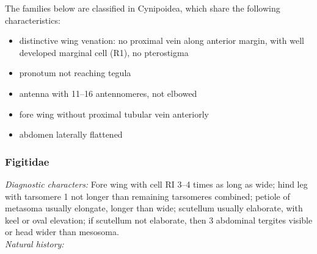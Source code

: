 \documentclass[letterpaper, 11pt]{article}
\begin{document}
\noindent{}The families below are classified in Cynipoidea, which share the following characteristics:
\begin{itemize}
\item distinctive wing venation: no proximal vein along anterior margin, with well developed marginal cell (R1), no pterostigma
\item pronotum not reaching tegula
\item antenna with 11--16 antennomeres, not elbowed
\item fore wing without proximal tubular vein anteriorly
\item abdomen laterally flattened
\end{itemize}

\subsubsection{Figitidae}
\noindent{}\textit{Diagnostic characters:} Fore wing with cell RI 3--4 times as long as wide; hind leg with tarsomere 1 not longer than remaining tarsomeres combined; petiole of metasoma usually elongate, longer than wide; scutellum usually elaborate, with keel or oval elevation; if scutellum not elaborate, then 3 abdominal tergites visible or head wider than mesosoma.\\

\noindent{}\textit{Natural history:} \\
\end{document}
